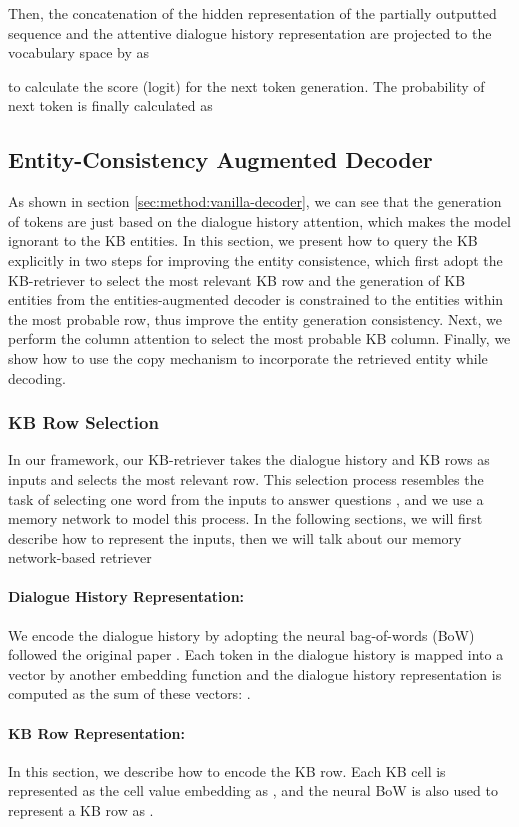 \documentclass[11pt,a4paper]{article}
\begin{document}
Then, the concatenation of the hidden representation of the partially outputted sequence 
and the attentive dialogue history representation 
are projected to the vocabulary space  by  as

to calculate the score (logit) for the next token generation.
The probability of next token   is finally calculated as


\subsection{Entity-Consistency Augmented Decoder}
As shown in section \ref{sec:method:vanilla-decoder}, we can see that the generation of tokens are just based on the dialogue history attention, which makes the model ignorant to the KB entities.
In this section, we present how to query the KB explicitly in two steps for improving the entity consistence,
which first adopt the KB-retriever to select the most relevant KB row and the generation of KB entities from the entities-augmented decoder is constrained to the entities within the most probable row, thus improve the entity generation consistency.
Next, we perform the column attention to select the most probable KB column.
Finally, we show how to use the copy mechanism to incorporate the retrieved entity while decoding.
\subsubsection{KB Row Selection}\label{model:row_retriever}
In our framework, our KB-retriever takes the dialogue history and KB rows as inputs and selects the most
 relevant row. This selection process resembles the task of selecting one word from 
 the inputs to answer questions \cite{sukhbaatar2015end}, and we use a memory network to model this process.
In the following sections, we will first describe how to represent the inputs, then we will talk about our memory network-based retriever

\paragraph{Dialogue History Representation:}
We encode the dialogue history by adopting the neural bag-of-words (BoW) followed the original paper \cite{sukhbaatar2015end}.
Each token in the dialogue history is mapped into a vector by another embedding function  
and the dialogue history representation  is computed as the sum of these vectors:
.

\paragraph{KB Row Representation:}
In this section, we describe how to encode the KB row. 
Each KB cell is represented as the 
cell value  embedding as ,
and the neural BoW is also used 
to represent a KB row  as
.
\end{document}
